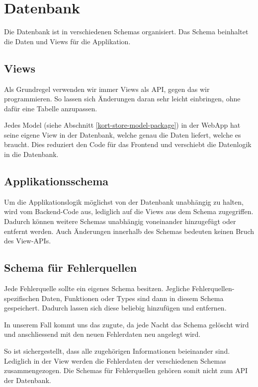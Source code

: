 \section{Datenbank}
Die Datenbank ist in verschiedenen Schemas organisiert.
Das Schema  beinhaltet die Daten und Views für die Applikation.

\subsection{Views}Als Grundregel verwenden wir immer Views als \gls{API}, gegen das wir programmieren.
So lassen sich Änderungen daran sehr leicht einbringen, ohne dafür eine Tabelle anzupassen.

Jedes Model (siehe Abschnitt \ref{kort-store-model-package})  in der \gls{WebApp} hat seine eigene View in der Datenbank, welche genau die Daten liefert, welche es braucht.
Dies reduziert den Code für das Frontend und verschiebt die Datenlogik in die Datenbank.

\subsection{Applikationsschema}
Um die Applikationslogik möglichst von der Datenbank unabhängig zu halten, wird vom Backend-Code aus, lediglich auf die Views aus dem Schema  zugegriffen.
Dadurch können weitere Schemas unabhängig voneinander hinzugefügt oder entfernt werden.
Auch Änderungen innerhalb des Schemas bedeuten keinen Bruch des View-\glspl{API}.

\subsection{Schema für Fehlerquellen}
Jede Fehlerquelle sollte ein eigenes Schema besitzen.
Jegliche Fehlerquellen-spezifischen Daten, Funktionen oder Types sind dann in diesem Schema gespeichert.
Dadurch lassen sich diese beliebig hinzufügen und entfernen.

In unserem Fall kommt uns das zugute, da jede Nacht das  Schema gelöscht wird und anschliessend mit den neuen Fehlerdaten neu angelegt wird.

So ist sichergestellt, dass alle zugehörigen Informationen beieinander sind.
Lediglich in der View  werden die Fehlerdaten der verschiedenen Schemas zusammengezogen.
Die Schemas für Fehlerquellen gehören somit nicht zum \gls{API} der Datenbank.

